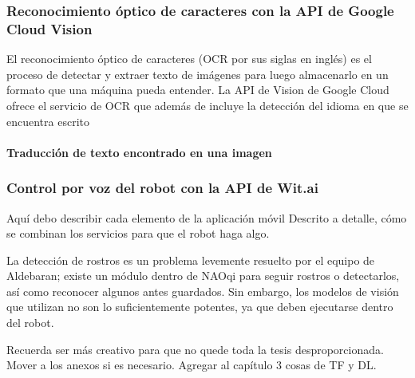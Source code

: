 \subsubsection{Reconocimiento óptico de caracteres con la API de Google Cloud Vision}

El reconocimiento óptico de caracteres (OCR por sus siglas en inglés) es 
el proceso de detectar y extraer texto de imágenes para luego
almacenarlo en un formato que una máquina pueda entender.
La API de Vision de Google Cloud ofrece el servicio de OCR
que además de incluye la detección del idioma en que se encuentra escrito


\paragraph{Traducción de texto encontrado en una imagen}

\subsubsection{Control por voz del robot con la API de Wit.ai}


Aquí debo describir cada elemento de la aplicación móvil
Descrito a detalle, cómo se combinan los servicios para que el robot
haga algo.

La detección  de rostros es un problema levemente resuelto por el equipo
de Aldebaran; existe un módulo dentro de NAOqi para seguir rostros o detectarlos,
así como reconocer algunos antes guardados. Sin embargo, los modelos de visión
que utilizan no son lo suficientemente potentes, ya que deben ejecutarse dentro
del robot. 

Recuerda ser más creativo para que no quede toda la tesis 
desproporcionada. Mover a los anexos si es necesario.
Agregar al capítulo 3 cosas de TF y DL.
